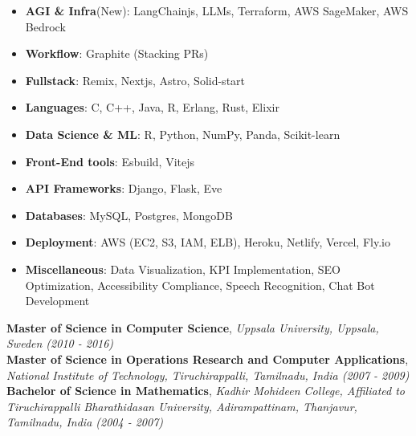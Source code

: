 \newpage
\begin{minipage}[t]{0.29\textwidth} %

\colorbox{cvblue!90}
{\color{white}  %
  \textwidth\relax %
  \begin{minipage}[t][\textheight][t]{0.82\textwidth}
  \raggedright
  \vspace*{2.5ex}

  \Large
  \begin{itemize}
      \item \textbf{AGI \& Infra}(New): LangChainjs, LLMs, Terraform, AWS SageMaker, AWS Bedrock
      \item \textbf{Workflow}: Graphite (Stacking PRs)
      \item \textbf{Fullstack}: Remix, Nextjs, Astro, Solid-start
      \item \textbf{Languages}: C, C++, Java, R, Erlang, Rust, Elixir
      \item \textbf{Data Science \& ML}: R, Python, NumPy, Panda, Scikit-learn
      \item \textbf{Front-End tools}: Esbuild, Vitejs
      \item \textbf{API Frameworks}: Django, Flask, Eve
      \item \textbf{Databases}: MySQL, Postgres, MongoDB
      \item \textbf{Deployment}: AWS (EC2, S3, IAM, ELB), Heroku, Netlify, Vercel, Fly.io
      \item \textbf{Miscellaneous}: Data Visualization, KPI Implementation, SEO Optimization, Accessibility Compliance, Speech Recognition, Chat Bot Development
  \end{itemize}

  \Large
  \Large
  \textbf{Master of Science in Computer Science}, \textit{Uppsala University, Uppsala, Sweden (2010 - 2016)}\\
  \vspace{0.5em}
  \textbf{Master of Science in Operations Research and Computer Applications}, \textit{National Institute of Technology, Tiruchirappalli, Tamilnadu, India (2007 - 2009)}\\
  \vspace{0.5em}
  \textbf{Bachelor of Science in Mathematics}, \textit{Kadhir Mohideen College, Affiliated to Tiruchirappalli Bharathidasan University, Adirampattinam, Thanjavur, Tamilnadu, India (2004 - 2007)}\\


\end{minipage}}
\end{minipage}
